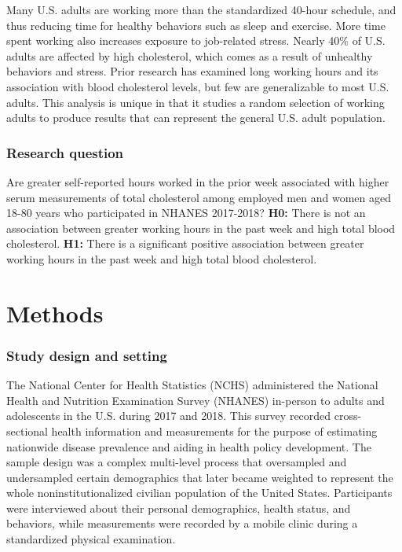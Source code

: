 \documentclass[]{elsarticle} %
\begin{document}
Many U.S. adults are working more than the standardized 40-hour
schedule, and thus reducing time for healthy behaviors such as sleep and
exercise. More time spent working also increases exposure to job-related
stress. Nearly 40\% of U.S. adults are affected by high cholesterol,
which comes as a result of unhealthy behaviors and stress. Prior
research has examined long working hours and its association with blood
cholesterol levels, but few are generalizable to most U.S. adults. This
analysis is unique in that it studies a random selection of working
adults to produce results that can represent the general U.S. adult
population.

\hypertarget{research-question}{%
\subsubsection{Research question}\label{research-question}}

Are greater self-reported hours worked in the prior week associated with
higher serum measurements of total cholesterol among employed men and
women aged 18-80 years who participated in NHANES 2017-2018?
\textbf{H0:} There is not an association between greater working hours
in the past week and high total blood cholesterol. \textbf{H1:} There is
a significant positive association between greater working hours in the
past week and high total blood cholesterol.

\hypertarget{methods}{%
\section{Methods}\label{methods}}

\hypertarget{study-design-and-setting}{%
\subsubsection{Study design and
setting}\label{study-design-and-setting}}

The National Center for Health Statistics (NCHS) administered the
National Health and Nutrition Examination Survey (NHANES) in-person to
adults and adolescents in the U.S. during 2017 and 2018. This survey
recorded cross-sectional health information and measurements for the
purpose of estimating nationwide disease prevalence and aiding in health
policy development. The sample design was a complex multi-level process
that oversampled and undersampled certain demographics that later became
weighted to represent the whole noninstitutionalized civilian population
of the United States. Participants were interviewed about their personal
demographics, health status, and behaviors, while measurements were
recorded by a mobile clinic during a standardized physical examination.
\end{document}

